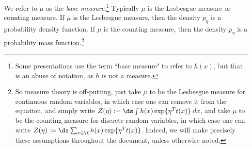 \begin{definition}
We refer to $\mu$ as the \textit{base measure}.\footnote{Some presentations use the term ``base measure" to refer to $h(x)$, but that is an abuse of notation, as $h$ is not a measure.}  Typically $\mu$ is the Lesbesgue measure or counting measure.  If $\mu$ is the Lesbesgue measure, then the density $p_\eta$ is a probability density function.  If $\mu$ is the counting measure, then the density $p_\eta$ is a probability mass function.\footnote{So measure theory is off-putting, just take $\mu$ to be the Lesbesgue measure for continuous random variables, in which case one can remove it from the equation, and simply write $Z(\eta) := \ds\int  h(x) \exp \{ \eta^T t(x)  \} \; dx $, and take $\mu$ to be the counting measure for discrete random variables, in which case one can write $Z(\eta) := \ds\sum_{x \in \X} h(x) \exp \{ \eta^T t(x)  \} $. Indeed, we will make precisely these assumptions throughout the document, unless otherwise noted. }  %
\label{def:exponential_family}
\end{definition} 

